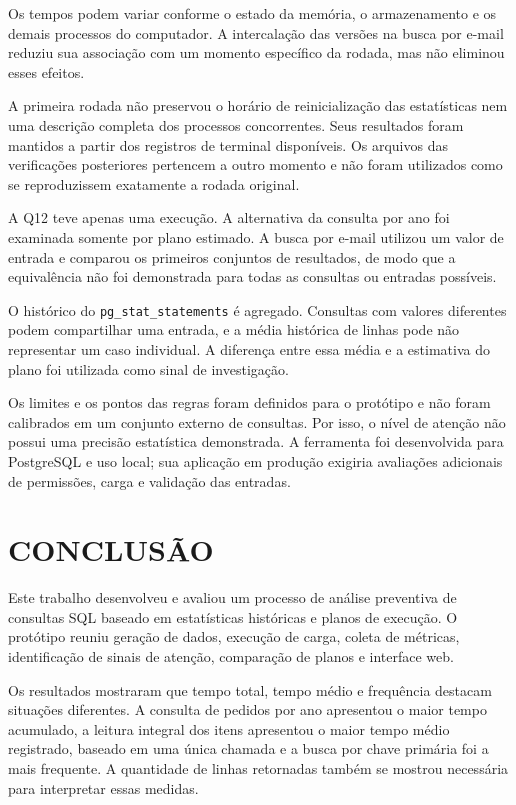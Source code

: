 \documentclass{UNESC}
\newcommand{\codigo}[1]{\texttt{#1}}
\begin{document}
Os tempos podem variar conforme o estado da memória, o armazenamento e os demais processos do computador. A intercalação das versões na busca por e-mail reduziu sua associação com um momento específico da rodada, mas não eliminou esses efeitos.

A primeira rodada não preservou o horário de reinicialização das estatísticas nem uma descrição completa dos processos concorrentes. Seus resultados foram mantidos a partir dos registros de terminal disponíveis. Os arquivos das verificações posteriores pertencem a outro momento e não foram utilizados como se reproduzissem exatamente a rodada original.

A Q12 teve apenas uma execução. A alternativa da consulta por ano foi examinada somente por plano estimado. A busca por e-mail utilizou um valor de entrada e comparou os primeiros conjuntos de resultados, de modo que a equivalência não foi demonstrada para todas as consultas ou entradas possíveis.

O histórico do \codigo{pg\_stat\_statements} é agregado. Consultas com valores diferentes podem compartilhar uma entrada, e a média histórica de linhas pode não representar um caso individual. A diferença entre essa média e a estimativa do plano foi utilizada como sinal de investigação.

Os limites e os pontos das regras foram definidos para o protótipo e não foram calibrados em um conjunto externo de consultas. Por isso, o nível de atenção não possui uma precisão estatística demonstrada. A ferramenta foi desenvolvida para PostgreSQL e uso local; sua aplicação em produção exigiria avaliações adicionais de permissões, carga e validação das entradas.


\section{CONCLUSÃO}

Este trabalho desenvolveu e avaliou um processo de análise preventiva de consultas SQL baseado em estatísticas históricas e planos de execução. O protótipo reuniu geração de dados, execução de carga, coleta de métricas, identificação de sinais de atenção, comparação de planos e interface web.

Os resultados mostraram que tempo total, tempo médio e frequência destacam situações diferentes. A consulta de pedidos por ano apresentou o maior tempo acumulado, a leitura integral dos itens apresentou o maior tempo médio registrado, baseado em uma única chamada e a busca por chave primária foi a mais frequente. A quantidade de linhas retornadas também se mostrou necessária para interpretar essas medidas.
\end{document}
